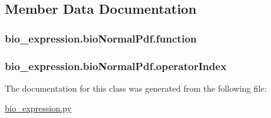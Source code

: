 \subsection{Member Data Documentation}
\hypertarget{classbio__expression_1_1bio_normal_pdf_ad59a9659d06a48d7d4a44037f56882c0}{
\subsubsection[{function}]{\setlength{\rightskip}{0pt plus 5cm}bio\+\_\+expression.\+bio\+Normal\+Pdf.\+function}}\label{classbio__expression_1_1bio_normal_pdf_ad59a9659d06a48d7d4a44037f56882c0}
\hypertarget{classbio__expression_1_1bio_normal_pdf_a1129591234db4f63d55b09674e027fa7}{
\subsubsection[{operator\+Index}]{\setlength{\rightskip}{0pt plus 5cm}bio\+\_\+expression.\+bio\+Normal\+Pdf.\+operator\+Index}}\label{classbio__expression_1_1bio_normal_pdf_a1129591234db4f63d55b09674e027fa7}


The documentation for this class was generated from the following file\+:\begin{DoxyCompactItemize}
\item 
\hyperlink{bio__expression_8py}{bio\+\_\+expression.\+py}\end{DoxyCompactItemize}
